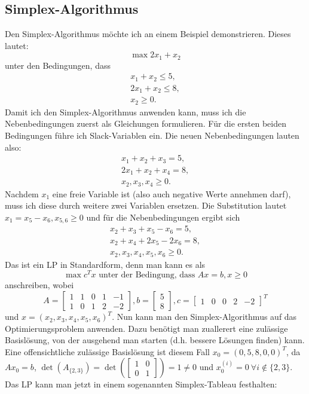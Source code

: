 \documentclass{article}
\begin{document}
\subsection{Simplex-Algorithmus}
Den Simplex-Algorithmus möchte ich an einem Beispiel demonstrieren. Dieses lautet:\[
\max 2x_1+x_2
\]unter den Bedingungen, dass\[
\begin{matrix}
    x_1+x_2\leq5,\\2x_1+x_2\leq8,\\x_2\geq0.
\end{matrix}
\]Damit ich den Simplex-Algorithmus anwenden kann, muss ich die Nebenbedingungen zuerst als Gleichungen formulieren. Für die ersten beiden Bedingungen führe ich Slack-Variablen ein. Die neuen Nebenbedingungen lauten also:\[
\begin{matrix}
    x_1+x_2+x_3=5,\\2x_1+x_2+x_4=8,\\x_2,x_3,x_4\geq0.
\end{matrix}
\]Nachdem \(x_1\) eine freie Variable ist (also auch negative Werte annehmen darf), muss ich diese durch weitere zwei Variablen ersetzen. Die Substitution lautet \(x_1=x_5-x_6,x_{5,6}\geq0\) und für die Nebenbedingungen ergibt sich\[
\begin{matrix}
x_2+x_3+x_5-x_6=5,\\x_2+x_4+2x_5-2x_6=8,\\x_2,x_3,x_4,x_5,x_6\geq0.
\end{matrix}
\] 
Das ist ein LP in Standardform, denn man kann es als \[
\max c^Tx\text{ unter der Bedingung, dass } Ax=b, x\geq0
\]anschreiben, wobei\[
A=\begin{bmatrix}
    1&1&0&1&-1\\
    1&0&1&2&-2
\end{bmatrix},b=\begin{bmatrix}
    5\\8
\end{bmatrix},c=\begin{bmatrix}
    1&0&0&2&-2
\end{bmatrix}^T
\]und \(x=(x_2,x_3,x_4,x_5,x_6)^T\). Nun kann man den Simplex-Algorithmus auf das Optimierungsproblem anwenden. Dazu benötigt man zuallerert eine zulässige Basislösung, von der ausgehend man starten (d.h. bessere Lösungen finden) kann. Eine offensichtliche zulässige Basislösung ist diesem Fall \(x_0=(0,5,8,0,0)^T\), da \(Ax_0=b\), \(\det(A_{\{2,3\}})=\det(\begin{bmatrix}
    1&0\\0&1
\end{bmatrix})=1\ne0\) und \(x_0^{(i)}=0\ \forall i\not\in\{2,3\}\). Das LP kann man jetzt in einem sogenannten Simplex-Tableau festhalten:
\end{document}
